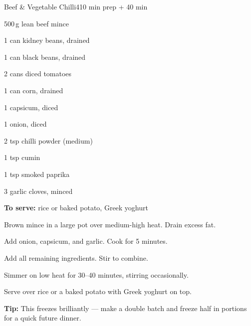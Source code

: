 \begin{recipebox}{Beef \& Vegetable Chilli}{4}{10 min prep + 40 min}
\begin{ingredients}
  \item 500\,g lean beef mince
  \item 1 can kidney beans, drained
  \item 1 can black beans, drained
  \item 2 cans diced tomatoes
  \item 1 can corn, drained
  \item 1 capsicum, diced
  \item 1 onion, diced
  \item 2 tsp chilli powder (medium)
  \item 1 tsp cumin
  \item 1 tsp smoked paprika
  \item 3 garlic cloves, minced
  \item \textbf{To serve:} rice or baked potato, Greek yoghurt
\end{ingredients}

\begin{method}
  \item Brown mince in a large pot over medium-high heat. Drain excess fat.
  \item Add onion, capsicum, and garlic. Cook for 5 minutes.
  \item Add all remaining ingredients. Stir to combine.
  \item Simmer on low heat for 30--40 minutes, stirring occasionally.
  \item Serve over rice or a baked potato with Greek yoghurt on top.
\end{method}

\begin{notelist}
  \item \textbf{Tip:} This freezes brilliantly --- make a double batch and freeze half in portions for a quick future dinner.
\end{notelist}
\end{recipebox}
